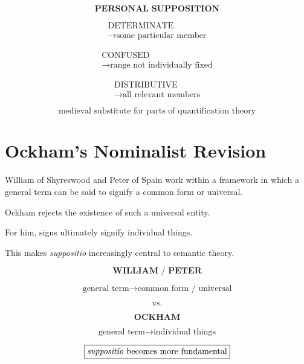 \documentclass[11pt]{article}
\newcommand{\latin}[1]{\textit{#1}}
\begin{document}
\begin{whiteboard}
\[
\textbf{PERSONAL SUPPOSITION}
\]

\[
\begin{array}{c}
\text{DETERMINATE}\\
\rightarrow \text{some particular member}
\end{array}
\]

\[
\begin{array}{c}
\text{CONFUSED}\\
\rightarrow \text{range not individually fixed}
\end{array}
\]

\[
\begin{array}{c}
\text{DISTRIBUTIVE}\\
\rightarrow \text{all relevant members}
\end{array}
\]

\[
\boxed{\text{medieval substitute for parts of quantification theory}}
\]
\end{whiteboard}

\section{Ockham's Nominalist Revision}

William of Shyreswood and Peter of Spain work within a framework
in which a general term can be said to signify a common form or
universal.

Ockham rejects the existence of such a universal entity.

For him, signs ultimately signify individual things.

This makes \latin{suppositio} increasingly central to semantic
theory.

\begin{whiteboard}
\[
\textbf{WILLIAM / PETER}
\]

\[
\text{general term}
\rightarrow
\text{common form / universal}
\]

\[
\text{vs.}
\]

\[
\textbf{OCKHAM}
\]

\[
\text{general term}
\rightarrow
\text{individual things}
\]

\[
\boxed{\text{\latin{suppositio} becomes more fundamental}}
\]
\end{whiteboard}

\end{document}

